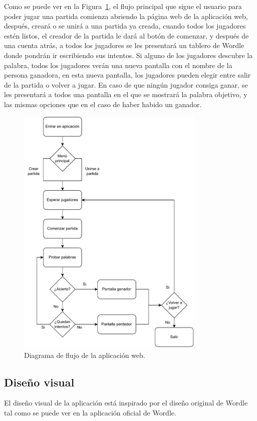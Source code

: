 Como se puede ver en la Figura~\ref{fig:web_diagram}, el flujo principal que sigue el usuario para poder jugar una partida comienza abriendo la página web de la aplicación web, después, creará o se unirá a una partida ya creada, cuando todos los jugadores estén listos, el creador de la partida le dará al botón de comenzar, y después de una cuenta atrás, a todos los jugadores se les presentará un tablero de Wordle donde pondrán ir escribiendo sus intentos. Si alguno de los jugadores descubre la palabra, todos los jugadores verán una nueva pantalla con el nombre de la persona ganadora, en esta nueva pantalla, los jugadores pueden elegir entre salir de la partida o volver a jugar. En caso de que ningún jugador consiga ganar, se les presentará a todos una pantalla en el que se mostrará la palabra objetivo, y las mismas opciones que en el caso de haber habido un ganador.

\begin{figure}[H]
	\centering
	\includegraphics[clip=true,width=0.8\textwidth]{./diagrams/webapp_flow.pdf}
	\caption{Diagrama de flujo de la aplicación web.}
	\label{fig:web_diagram}
\end{figure}

\subsection{Diseño visual}
El diseño visual de la aplicación está inspirado por el diseño original de Wordle tal como se puede ver en la aplicación oficial de Wordle.

